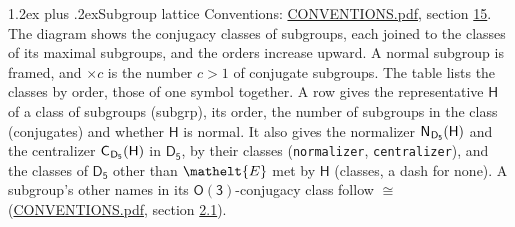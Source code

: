 \documentclass[10pt,a4paper]{article}
\makeatletter
\renewcommand\section{\@startsection{section}{1}{\z@}{-3ex plus -1ex minus -.2ex}%
  {1.2ex plus .2ex}{\normalfont\large\sffamily\bfseries\color{parttitle}}}
\numberwithin{equation}{section}
\newcommand{\eltfont}[1]{{\let\sigma\eltsigma\mathelt{#1}}}
\newcommand{\grp}[1]{\mathsf{#1}}
\newcommand{\cls}[1]{\eltfont{#1}}
\newcommand{\samecls}{\cong}
\newcommand{\nconj}[1]{{\scriptsize$\times#1$}}
\newcommand{\hairsp}{\mkern1mu}
\makeatother
\begin{document}
\section{Subgroup lattice}\label{s:subgroups}
Conventions: \href{../../CONVENTIONS.pdf}{CONVENTIONS.pdf}, section \href{../../CONVENTIONS.pdf\#conv.15}{15}.
The diagram shows the conjugacy classes of subgroups, each joined to the classes of its maximal subgroups, and the orders increase upward. A normal subgroup is framed, and ${\times}c$ is the number $c > 1$ of conjugate subgroups. The table lists the classes by order, those of one symbol together. \label{n:group.H}\label{n:head.subgroup}\label{n:head.order}\label{n:head.conjugates}\label{n:head.normal}A row gives the representative $\grp{H}$ of a class of subgroups (subgrp), its order, the number of subgroups in the class (conjugates) and whether $\grp{H}$ is normal. \label{n:group.normalizer}\label{n:group.centralizer}\label{n:head.classes}It also gives the normalizer $\grp{N}_{\hairsp \grp{D_{5}}}(\grp{H})$ and the centralizer $\grp{C}_{\hairsp \grp{D_{5}}}(\grp{H})$ in $\grp{D_{5}}$, by their classes (\texttt{normalizer}, \texttt{centralizer}), and the classes of $\grp{D_{5}}$ other than $\cls{E}$ met by $\grp{H}$ (classes, a dash for none). A subgroup's other names in its \href{O3.pdf}{$\grp{O(3)}$}-conjugacy class follow $\samecls$ (\href{../../CONVENTIONS.pdf}{CONVENTIONS.pdf}, section \href{../../CONVENTIONS.pdf\#conv.2.1}{2.1}).
\begin{center}
\end{center}
\end{document}
